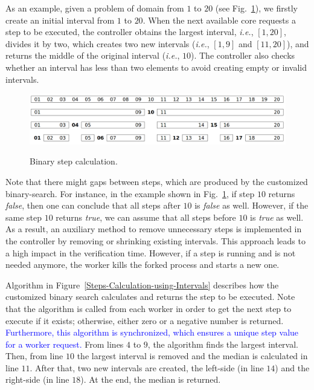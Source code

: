 \documentclass{doublecol-new}
\theoremstyle{TH}{
\newtheorem{lemma}{Lemma}
\newtheorem{theorem}[lemma]{Theorem}
\newtheorem{corrolary}[lemma]{Corrolary}
\newtheorem{conjecture}[lemma]{Conjecture}
\newtheorem{proposition}[lemma]{Proposition}
\newtheorem{claim}[lemma]{Claim}
\newtheorem{stheorem}[lemma]{Wrong Theorem}
\newtheorem{algorithm}{Algorithm}
}
\theoremstyle{THrm}{
\newtheorem{definition}{Definition}[section]
\newtheorem{question}{Question}[section]
\newtheorem{remark}{Remark}
\newtheorem{scheme}{Scheme}
}
\theoremstyle{THhit}{
\newtheorem{case}{Case}[section]
}
\begin{document}
As an example, given a problem of domain from $1$ to $20$ (see Fig.~\ref{Binary-Step-Calculation}), we firstly create an initial interval from $1$ to $20$. When the next available core requests a step to be executed, the controller obtains the largest interval, {\it i.e.}, $\left[1,20\right]$, divides it by two, which creates two new intervals ({\it i.e.}, $\left[1,9\right]$ and $\left[11,20\right]$), and returns the middle of the original interval ({\it i.e.}, $10$). The controller also checks whether an interval has less than two elements to avoid creating empty or invalid intervals.

\begin{figure}[h!]
	\caption{Binary step calculation.}
	\centering
	\includegraphics[scale=0.17]{figures/Fig4.png}	
	\label{Binary-Step-Calculation}
\end{figure}

Note that there might gaps between steps, which are produced by the customized binary-search. For instance, in the example shown in Fig.~\ref{Binary-Step-Calculation}, if step $10$ returns \textit{false}, then one can conclude that all steps after $10$ is \textit{false} as well. However, if the same step $10$ returns \textit{true}, we can assume that all steps before $10$ is \textit{true} as well. As a result, an auxiliary method to remove unnecessary steps is implemented in the controller by removing or shrinking existing intervals. This approach leads to a high impact in the verification time. However, if a step is running and is not needed anymore, the worker kills the forked process and starts a new one.

Algorithm in Figure~\ref{Steps-Calculation-using-Intervals} describes how the customized binary search calculates and returns the step to be executed. 
Note that the algorithm is called from each worker in order to get the next step to execute if it exists; otherwise, either zero or a negative number is returned. \textcolor{blue}{Furthermore, this algorithm is synchronized, which ensures a unique step value for a worker request.}
From lines $4$ to $9$, the algorithm finds the largest interval. Then, from line $10$ the largest interval is removed and the median is calculated in line $11$. After that, two new intervals are created, the left-side (in line $14$) and the right-side (in line $18$). At the end, the median is returned.
\end{document}
